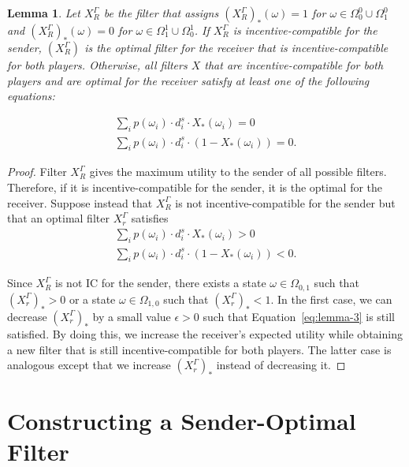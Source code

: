 \documentclass[submission,copyright,creativecommons]{eptcs}
\newtheorem{lemma}{Lemma}
\begin{document}
\begin{lemma}
Let $X_R^\Gamma$ be the filter that assigns $(X_R^\Gamma)_*(\omega) = 1$ for $\omega \in \Omega_0^0 \cup \Omega_1^0$ and $(X_R^\Gamma)_*(\omega) = 0$ for $\omega \in \Omega_1^1 \cup \Omega_0^1$. If $X_R^\Gamma$ is incentive-compatible for the sender, $(X_R^\Gamma)$ is the optimal filter for the receiver that is incentive-compatible for both players. Otherwise, all filters $X$ that are incentive-compatible for both players and are optimal for the receiver satisfy at least one of the following equations:

$$
\begin{array}{ll}
\sum_i p(\omega_i) \cdot d_i^s \cdot X_*(\omega_i) = 0\\
\sum_i p(\omega_i) \cdot d_i^s \cdot (1 - X_*(\omega_i)) = 0.
\end{array}
$$

\end{lemma}

\begin{proof}
Filter $X_R^\Gamma$ gives the maximum utility to the sender of all possible filters. Therefore, if it is incentive-compatible for the sender, it is the optimal for the receiver. Suppose instead that $X_R^\Gamma$ is not incentive-compatible for the sender but that an optimal filter $X_r^\Gamma$ satisfies 
\begin{equation}\label{eq:lemma-3}
\begin{array}{ll}
\sum_i p(\omega_i) \cdot d_i^s \cdot X_*(\omega_i) > 0\\
\sum_i p(\omega_i) \cdot d_i^s \cdot (1 - X_*(\omega_i)) < 0.
\end{array}
\end{equation}

Since $X_R^\Gamma$ is not IC for the sender, there exists a state $\omega \in \Omega_{0,1}$ such that $(X_r^\Gamma)_* > 0$ or a state $\omega \in \Omega_{1,0}$ such that $(X_r^\Gamma)_* < 1$. In the first case, we can decrease $(X_r^\Gamma)_*$ by a small value $\epsilon > 0$ such that Equation~\ref{eq:lemma-3} is still satisfied. By doing this, we increase the receiver's expected utility while obtaining a new filter that is still incentive-compatible for both players. The latter case is analogous except that we increase $(X_r^\Gamma)_*$ instead of decreasing it.
\end{proof}

\section{Constructing a Sender-Optimal Filter}\label{sec:sender-algorithm}
\end{document}
